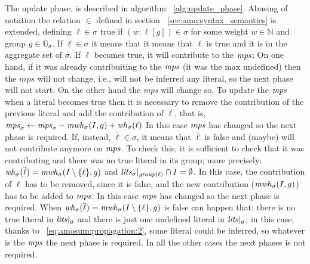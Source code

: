 The update phase, is described in algorithm ~\ref{alg:update_phase}.
Abusing of notation the relation $\in$ defined in section ~\ref{sec:amo:syntax_semantics}
is extended, defining $\ell \in \sigma$ true if $(w : \ell [g]) \in \sigma$ for some 
weight $w \in \mathbb{N}$ and group $g \in \mathbb{G}_{\sigma}$.  
If $\ell \in \sigma$ it means that it means that $\ell$ is true and it is in the 
aggregate set of $\sigma$. 
If $\ell$ becomes true, it will contribute to the $\mathit{mps}$;
On one hand, if it was already contribuiting to the $\mathit{mps}$ (it was the max undefined)
then the $mps$ will not change, i.e., will not be inferred any 
literal, so the next phase will not start.
On the other hand the \textit{mps} will change so.
To update the $\mathit{mps}$ when a literal becomes true then 
it is necessary to remove the contribution of the previous 
literal and add the contribution of $\ell$, that is,
$\mathit{mps}_\sigma \gets \mathit{mps}_\sigma -\mathit{mwh}_\sigma(I,g) + \mathit{wh}_\sigma(\ell)$\;
In this case $\mathit{mps}$ has changed so the next phase is required.
If, instead, $\overline{\ell} \in \sigma$, it means that $\overline{\ell}$ is false
and (maybe) will not contribute anymore on $\mathit{mps}$.
To check this, it is sufficient to check that it 
was contributing and there was no true literal in its group;
more precisely: $\mathit{wh}_\sigma(\overline{\ell}) = \mathit{mwh}_\sigma(I \setminus \{\ell\},g)$
and $\mathit{lits}_\sigma|_{\mathit{group}(\ell)} \cap I = \emptyset$.
In this case, the contribution of $\ell$ has to be removed, since it is false,
and the new contribution ($\mathit{mwh}_\sigma(I,g)$) has to be added to $\mathit{mps}$.
In this case $\mathit{mps}$ has changed so the next phase is required.
When $\mathit{wh}_\sigma(\overline{\ell}) = \mathit{mwh}_\sigma(I \setminus \{\ell\},g)$
is false can happen that: there is no true literal in $\mathit{lits}|_g$ and
there is just one undefined literal in $\mathit{lits}|_g$;
in this case, thanks to ~\eqref{eq:amosum:propagation:2},
some literal could be inferred, so whatever is the $\mathit{mps}$
the next phase is required.
In all the other cases the next phases is not required.


